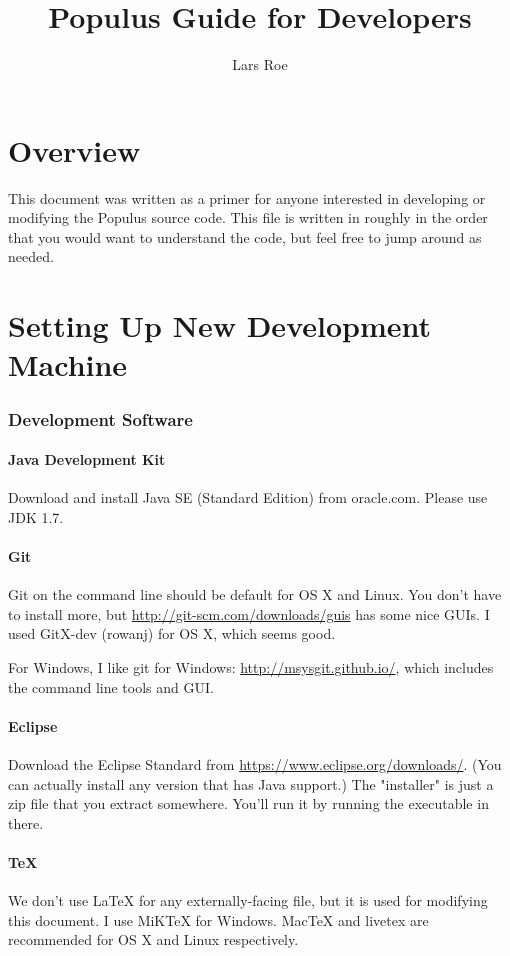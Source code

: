\documentclass[12pt]{article}
\title{Populus Guide for Developers}
\author{Lars Roe}
\begin{document}
\maketitle
\newpage

\tableofcontents
\newpage

\part{Overview}
This document was written as a primer for anyone interested in developing or modifying the Populus source code.  This file is written in roughly in the order that you would want to understand the code, but feel free to jump around as needed.


\part{Setting Up New Development Machine}
\section{Development Software}
\subsection{Java Development Kit}
Download and install Java SE (Standard Edition) from oracle.com.  Please use JDK 1.7.

\subsection{Git}
Git on the command line should be default for OS X and Linux.  You don't have to install more, but \url{http://git-scm.com/downloads/guis} has some nice GUIs.  I used GitX-dev (rowanj) for OS X, which seems good.

For Windows, I like git for Windows:  \url{http://msysgit.github.io/}, which includes the command line tools and GUI.

\subsection{Eclipse}
Download the Eclipse Standard from \url{https://www.eclipse.org/downloads/}.  (You can actually install any version that has Java support.)  The "installer" is just a zip file that you extract somewhere.  You'll run it by running the executable in there.

\subsection{TeX}
We don't use LaTeX for any externally-facing file, but it is used for modifying this document.  I use MiKTeX for Windows.  MacTeX and livetex are recommended for OS X and Linux respectively.
\end{document}
